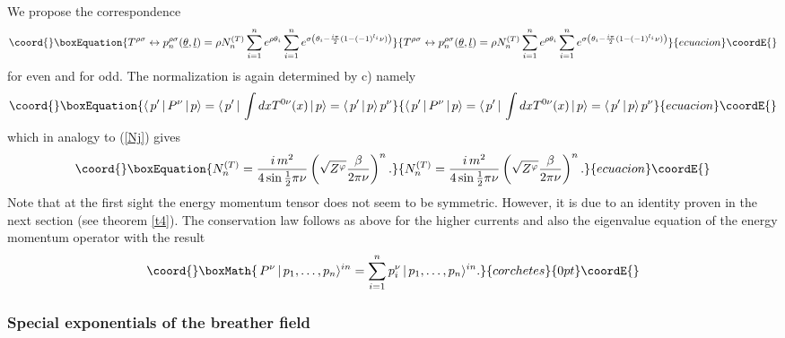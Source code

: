\documentclass[a4paper,a4paper]{article}
\begin{document}
We propose the correspondence 
\begin{equation}\coord{}\boxEquation{
T^{\rho \sigma }\leftrightarrow p_{n}^{\rho \sigma }(\underline{\theta },
\underline{l})=\rho N_{n}^{(T)}\sum\limits_{i=1}^{n}e^{\rho \theta
_{i}}\sum\limits_{i=1}^{n}e^{\sigma \left( \theta _{i}-\frac{i\pi }{2}
(1-(-1)^{l_{i}}\nu )\right) }  \label{p4}
}{
T^{\rho \sigma }\leftrightarrow p_{n}^{\rho \sigma }(\underline{\theta },
\underline{l})=\rho N_{n}^{(T)}\sum\limits_{i=1}^{n}e^{\rho \theta
_{i}}\sum\limits_{i=1}^{n}e^{\sigma \left( \theta _{i}-\frac{i\pi }{2}
(1-(-1)^{l_{i}}\nu )\right) }  }{ecuacion}\coordE{}\end{equation}
for \coordHE{} even and \coordHE{} for \coordHE{} odd. The normalization is
again determined by c) namely 
\begin{equation}\coord{}\boxEquation{
\langle \,p^{\prime }\,|\,P^{\nu }\,|\,p\rangle =\langle \,p^{\prime
}\,|\,\int dxT^{0\nu }(x)\,|\,p\rangle =\langle \,p^{\prime }\,|\,p\rangle
\,p^{\nu }  \label{Nt}
}{
\langle \,p^{\prime }\,|\,P^{\nu }\,|\,p\rangle =\langle \,p^{\prime
}\,|\,\int dxT^{0\nu }(x)\,|\,p\rangle =\langle \,p^{\prime }\,|\,p\rangle
\,p^{\nu }  }{ecuacion}\coordE{}\end{equation}
which in analogy to (\ref{Nj}) gives 
\begin{equation}\coord{}\boxEquation{
N_{n}^{(T)}=\frac{i\,m^{2}}{4\sin \tfrac{1}{2}\pi \nu }\left( \sqrt{
Z^{\varphi }}\frac{\beta }{2\pi \nu }\right) ^{n}.  \label{4.4}
}{
N_{n}^{(T)}=\frac{i\,m^{2}}{4\sin \tfrac{1}{2}\pi \nu }\left( \sqrt{
Z^{\varphi }}\frac{\beta }{2\pi \nu }\right) ^{n}.  }{ecuacion}\coordE{}\end{equation}
Note that at the first sight the energy momentum tensor does not seem to be
symmetric. However, it is due to an identity proven in the next section (see
theorem \ref{t4}). The conservation law follows as above for the higher
currents and also the eigenvalue equation of the energy momentum operator
with the result 
\[\coord{}\boxMath{
\,P^{\nu }\,|\,p_{1},\dots ,p_{n}\rangle ^{in}=\sum_{i=1}^{n}p_{i}^{\nu
}\,|\,p_{1},\dots ,p_{n}\rangle ^{in}. 
}{corchetes}{0pt}\coordE{}\]

\subsubsection{Special exponentials of the breather field}
\end{document}
